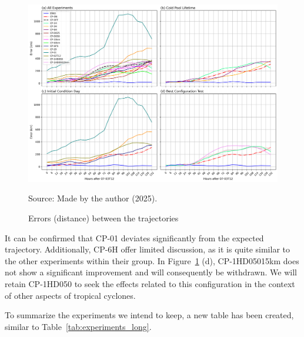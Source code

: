 \begin{figure}[!htb]
    \centering
    \caption{Errors (distance) between the trajectories} %
    \includegraphics[width=\textwidth]{docs/figuras/chapter5/panel_2x2_error_comparison.png} %
    \vspace{0.5em}
    
    Source: Made by the author (2025). %
    \label{fig:panel_errors_before} %
\end{figure}

\pagebreak

It can be confirmed that CP-01 deviates significantly from the expected trajectory. Additionally, CP-6H offer limited discussion, as it is quite similar to the other experiments within their group. In Figure~\ref{fig:panel_errors_before} (d), CP-1HD05015km does not show a significant improvement and will consequently be withdrawn. We will retain CP-1HD050 to seek the effects related to this configuration in the context of other aspects of tropical cyclones.

To summarize the experiments we intend to keep, a new table has been created, similar to Table~\ref{tab:experiments_long}.

\pagebreak

\begin{center}
 \label{tab:selected_experiments}
\end{center}

